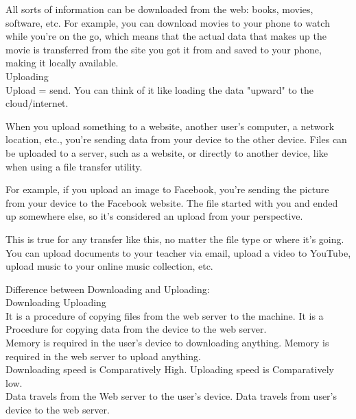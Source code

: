 \documentclass[11pt,a4paper,twoside]{article}
\begin{document}
All sorts of information can be downloaded from the web: books, movies, software, etc. For example, you can download movies to your phone to watch while you're on the go, which means that the actual data that makes up the movie is transferred from the site you got it from and saved to your phone, making it locally available.\\
Uploading\\
Upload = send. You can think of it like loading the data "upward" to the cloud/internet.\par
When you upload something to a website, another user's computer, a network location, etc., you're sending data from your device to the other device. Files can be uploaded to a server, such as a website, or directly to another device, like when using a file transfer utility.\par
For example, if you upload an image to Facebook, you're sending the picture from your device to the Facebook website. The file started with you and ended up somewhere else, so it's considered an upload from your perspective.\par
This is true for any transfer like this, no matter the file type or where it's going. You can upload documents to your teacher via email, upload a video to YouTube, upload music to your online music collection, etc.\par
Difference between Downloading and Uploading:\\
Downloading	Uploading\\
It is a procedure of copying files from the web server to the machine.	It is a Procedure for copying data from the device to the web server.\\
Memory is required in the user’s device to downloading anything.	Memory is required in the web server to upload anything.\\
Downloading speed is Comparatively High.	Uploading speed is Comparatively low.\\
Data travels from the Web server to the user’s device.	Data travels from user’s device to the web server.
\newpage
\end{document}
